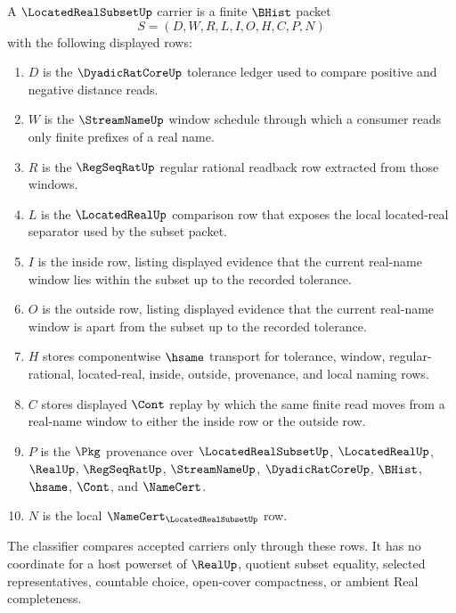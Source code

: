 \begin{definition}
\label{def:located-real-subset-carrier}
A $\LocatedRealSubsetUp$ carrier is a finite $\BHist$ packet
$$
S=(D,W,R,L,I,O,H,C,P,N)
$$
with the following displayed rows:
\begin{enumerate}
\item $D$ is the $\DyadicRatCoreUp$ tolerance ledger used to compare positive and negative distance reads.
\item $W$ is the $\StreamNameUp$ window schedule through which a consumer reads only finite prefixes of a real name.
\item $R$ is the $\RegSeqRatUp$ regular rational readback row extracted from those windows.
\item $L$ is the $\LocatedRealUp$ comparison row that exposes the local located-real separator used by the subset packet.
\item $I$ is the inside row, listing displayed evidence that the current real-name window lies within the subset up to the recorded tolerance.
\item $O$ is the outside row, listing displayed evidence that the current real-name window is apart from the subset up to the recorded tolerance.
\item $H$ stores componentwise $\hsame$ transport for tolerance, window, regular-rational, located-real, inside, outside, provenance, and local naming rows.
\item $C$ stores displayed $\Cont$ replay by which the same finite read moves from a real-name window to either the inside row or the outside row.
\item $P$ is the $\Pkg$ provenance over $\LocatedRealSubsetUp$, $\LocatedRealUp$, $\RealUp$, $\RegSeqRatUp$, $\StreamNameUp$, $\DyadicRatCoreUp$, $\BHist$, $\hsame$, $\Cont$, and $\NameCert$.
\item $N$ is the local $\NameCert_{\LocatedRealSubsetUp}$ row.
\end{enumerate}
The classifier compares accepted carriers only through these rows. It has no coordinate for a host powerset of $\RealUp$, quotient subset equality, selected representatives, countable choice, open-cover compactness, or ambient Real completeness.
\end{definition}

